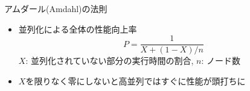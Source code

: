\begin{frame}[t,fragile]{アムダール(Amdahl)の法則}
  \begin{itemize}
    \setlength{\itemsep}{1em}
  \item 並列化による全体の性能向上率
    \[
    P = \frac{1}{X+(1-X)/n}
    \]
    $X$: 並列化されていない部分の実行時間の割合, $n$: ノード数
  \item $X$を限りなく零にしないと高並列ではすぐに性能が頭打ちに
  \end{itemize}
  \vspace*{-0em}\hspace*{1em}
\end{frame}
